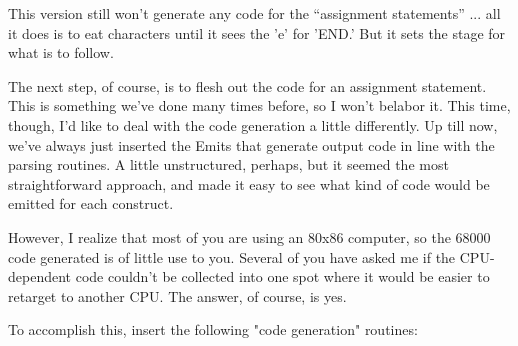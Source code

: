 This version still won't generate any code for  the  ``assignment statements'' ... all it does is to eat characters  until  it  sees the 'e' for 'END.'  But it sets the stage for what is to follow.

The  next  step, of  course, is  to  flesh out the code for  an assignment statement. This  is  something  we've done many times before, so  I  won't belabor it. This time, though, I'd like to deal with the code generation a little differently. Up till now, we've always just inserted the Emits that generate output code in line with  the parsing routines. A little unstructured, perhaps, but it seemed the most straightforward approach, and made it easy to see what kind of code would be emitted for each construct.

However, I realize that most of you are using an  80x86 computer, so  the 68000 code generated is of little use to you. Several of you have asked me if the CPU-dependent code couldn't be collected into one spot  where  it  would  be easier to retarget to another CPU. The answer, of course, is yes.

To  accomplish  this, insert  the  following  "code  generation" routines:

